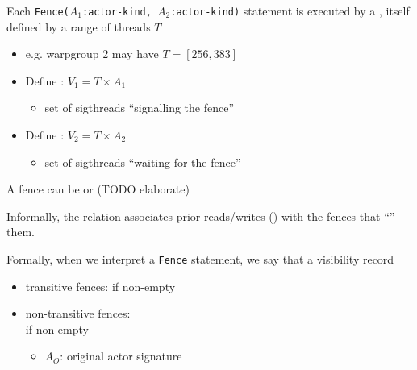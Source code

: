 \begin{minipage}[t]{0.48\textwidth}\fixminipage

Each \texttt{Fence($A_1$:\textsf{actor-kind}, $A_2$:\textsf{actor-kind})} statement is executed by a , itself defined by a range of threads $T$

\begin{itemize}
  \item e.g. warpgroup 2 may have $T = [256, 383]$
  \item Define : $V_1 = T \times A_1$
  \begin{itemize}
    \item set of sigthreads ``signalling the fence''
  \end{itemize}
  \item Define : $V_2 = T \times A_2$
  \begin{itemize}
    \item set of sigthreads ``waiting for the fence''
  \end{itemize}
\end{itemize}

A fence can be  or  (TODO elaborate)

Informally, the  relation associates prior reads/writes () with the fences that ``'' them.

Formally, when we interpret a \texttt{Fence} statement, we say that a visibility record 
\begin{itemize}
  \item transitive fences: if  non-empty
  \item non-transitive fences:\\if {} non-empty
  \begin{itemize}
    \item $A_O$: original actor signature
  \end{itemize}
\end{itemize}

\end{minipage}
\hfill
